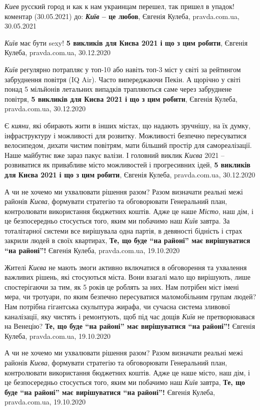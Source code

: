 \emph{Киев} русский город и как к нам украинцам перешел, так пришел в упадок!
коментар (30.05.2021) до: \textbf{\emph{Київ} – це любов}, Євгенія Кулеба, pravda.com.ua, 30.05.2021

\emph{Київ} має бути sexy! 
\textbf{5 викликів для Києва 2021 і що з цим робити}, Євгенія Кулеба, pravda.com.ua, 30.12.2020

\emph{Київ} регулярно потрапляє у топ-10 або навіть топ-3 міст у світі за
рейтингом забруднення повітря (IQ Air). Часто випереджаючи Пекін. А щорічно у
світі понад 5 мільйонів летальних випадків трапляються саме через забруднене
повітря,
\textbf{5 викликів для Києва 2021 і що з цим робити}, Євгенія Кулеба, pravda.com.ua, 30.12.2020

Є \emph{кияни}, які обирають жити в інших містах, що надають зручнішу, на їх
думку, інфраструктуру і можливості для розвитку. Можливості безпечно
пересуватися велосипедом, дихати чистим повітрям, мати більший простір для
самореалізації.  Наше майбутнє вже зараз пакує валізи. І головний виклик
\emph{Києва} 2021 – розвиватися як привабливе місто можливостей і прогресивних
ідей,
\textbf{5 викликів для Києва 2021 і що з цим робити}, Євгенія Кулеба, pravda.com.ua, 30.12.2020

А чи не хочемо ми ухвалювати рішення разом? Разом визначати реальні межі
районів \emph{Києва}, формувати стратегію та обговорювати Генеральний план,
контролювати використання бюджетних коштів. Адже це наше \emph{Місто}, наш дім, і це
безпосередньо стосується того, яким ми побачимо наш \emph{Київ} завтра.  За
тоталітарної системи все вирішувала одна партія, в девяності бідність і страх
закрили людей в своїх квартирах, 
\textbf{Те, що буде \enquote{на районі} має вирішуватися \enquote{на районі}!} Євгенія Кулеба, pravda.com.ua, 19.10.2020

Жителі \emph{Києва} не мають змоги активно включатися в обговорення та ухвалення
важливих рішень, які стосуються міста. Вони взагалі мало що вирішують, лише
спостерігаючи за тим, як 5 років це роблять за них. Нам потрібен міст імені
мера, чи тротуари, по яким безпечно пересуватися маломобільним групам людей?
Нам потрібна гігантська скульптура жирафа, чи сучасна система зливової
каналізації, яку чистять і ремонтують, щоб під час дощів \emph{Київ} не претворювавася
на Венецію?
\textbf{Те, що буде \enquote{на районі} має вирішуватися \enquote{на районі}!} Євгенія Кулеба, pravda.com.ua, 19.10.2020

А чи не хочемо ми ухвалювати рішення разом? Разом визначати реальні межі
районів \emph{Києва}, формувати стратегію та обговорювати Генеральний план,
контролювати використання бюджетних коштів. Адже це наше місто, наш дім, і це
безпосередньо стосується того, яким ми побачимо наш \emph{Київ} завтра,
\textbf{Те, що буде \enquote{на районі} має вирішуватися \enquote{на районі}!} Євгенія Кулеба, pravda.com.ua, 19.10.2020

